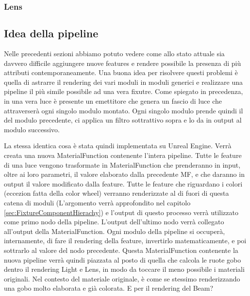 \documentclass[main.tex]{subfiles}
\begin{document}
\subsubsection{Lens}\label{subsec:2_1_lens}


\subsection{Idea della pipeline}\label{subsec:2_pipelineIdea}
Nelle precedenti sezioni abbiamo potuto vedere come allo stato attuale sia davvero difficile aggiungere nuove features e rendere possibile la presenza di più attributi contemporaneamente. Una buona idea per risolvere questi problemi è quella di astrarre il rendering dei vari moduli in moduli generici e realizzare una pipeline il più simile possibile ad una vera fixutre. Come spiegato in precedenza, in una vera luce è presente un emettitore che genera un fascio di luce che attraverserà ogni singolo modulo montato. Ogni singolo modulo prende quindi il  del modulo precedente, ci applica un filtro sottrattivo sopra e lo da in output al modulo successivo. \newline

La stessa identica cosa è stata quindi implementata su Unreal Engine. Verrà creata una nuova MaterialFunction contenente l'intera pipeline. Tutte le feature di una luce vengono trasformate in MaterialFunction che prenderanno in input, oltre ai loro parametri, il valore elaborato dalla precedente MF, e che daranno in output il valore modificato dalla feature. Tutte le feature che riguardano i colori (eccezion fatta della color wheel) verranno renderizzate al di fuori di questa catena di moduli (L'argomento verrà approfondito nel capitolo \ref{sec:FixtureComponentHierachy}) e l'output di questo processo verrà utilizzato come primo nodo della pipeline. L'output dell'ultimo nodo verrà collegato all'output della MaterialFunction. Ogni modulo della pipeline si occuperà, internamente, di fare il rendering della feature, invertirlo matematicamente, e poi sottrarlo al valore del nodo precedente. \newline
Questa MaterialFunction contenente la nuova pipeline verrà quindi piazzata al posto di quella che calcola le ruote gobo dentro il rendering Light e Lens, in modo da toccare il meno possibile i materiali originali. Nel contesto del materiale originale, è come se stessimo renderizzando una gobo molto elaborata e già colorata. \newline
E per il rendering del Beam?
\end{document}
